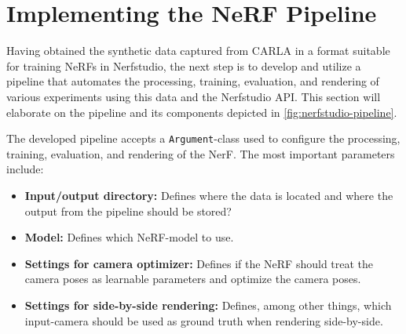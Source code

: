 \section{Implementing the NeRF Pipeline} \label{sec:nerfstudio-pipeline}
\begin{comment}
Premise: Have data in a Nerfstudio format, collected from CARLA.
Question: How can I train a NeRF that represent the same scene?

\begin{itemize}
    \item Explain the Nerfstudio API and the created pipeline. Train, eval, render
    \item Go into detail on e.g. the train/eval-split, training parameters, etc. Add additional info to the appendix.
\end{itemize}
\end{comment}





Having obtained the synthetic data captured from CARLA in a format suitable for training NeRFs in Nerfstudio, the next step is to develop and utilize a pipeline that automates the processing, training, evaluation, and rendering of various experiments using this data and the Nerfstudio API. This section will elaborate on the pipeline and its components depicted in \autoref{fig:nerfstudio-pipeline}.



The developed pipeline accepts a \texttt{Argument}-class used to configure the processing, training, evaluation, and rendering of the NerF. The most important parameters include:

\begin{itemize}
    \item \textbf{Input/output directory:} Defines where the data is located and where the output from the pipeline should be stored?
    \item \textbf{Model:} Defines which NeRF-model to use.
    \item \textbf{Settings for camera optimizer:} Defines if the NeRF should treat the camera poses as learnable parameters and optimize the camera poses.
    \item \textbf{Settings for side-by-side rendering:} Defines, among other things, which input-camera should be used as ground truth when rendering side-by-side.
\end{itemize}


